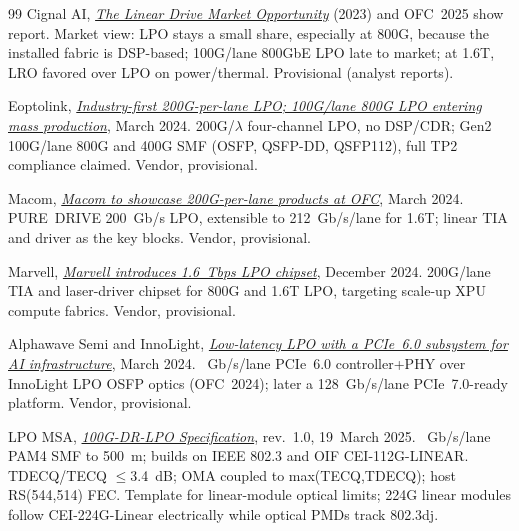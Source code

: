 \begin{thebibliography}{99}
Cignal AI, \emph{\href{https://cignal.ai/2023/08/linear-drive-market-opportunity/}{The
Linear Drive Market Opportunity}} (2023) and OFC~2025 show report.
\newblock Market view: LPO stays a small share, especially at 800G, because the
installed fabric is DSP-based; 100G/lane 800GbE LPO late to market; at 1.6T,
LRO favored over LPO on power/thermal. Provisional (analyst reports).

Eoptolink, \emph{\href{https://www.eoptolink.com/news/13-new-products/348-eoptolink-demonstrates-industry-1st-200g-lane-lpos-with-100g-lane-800g-lpos-entering-mass-production}{Industry-first
200G-per-lane LPO; 100G/lane 800G LPO entering mass production}}, March 2024.
\newblock 200G/$\lambda$ four-channel LPO, no DSP/CDR; Gen2 100G/lane 800G and
400G SMF (OSFP, QSFP-DD, QSFP112), full TP2 compliance claimed. Vendor,
provisional.

Macom, \emph{\href{https://ir.macom.com/news-releases/news-release-details/macom-showcase-200g-lane-products-optical-fiber-communication}{Macom
to showcase 200G-per-lane products at OFC}}, March 2024.
\newblock PURE~DRIVE 200~Gb/s LPO, extensible to 212~Gb/s/lane for 1.6T; linear
TIA and driver as the key blocks. Vendor, provisional.

Marvell, \emph{\href{https://www.marvell.com/company/newsroom/marvell-introduces-1-6-tbps-lpo-chipset.html}{Marvell
introduces 1.6~Tbps LPO chipset}}, December 2024.
\newblock 200G/lane TIA and laser-driver chipset for 800G and 1.6T LPO, targeting
scale-up XPU compute fabrics. Vendor, provisional.

Alphawave Semi and InnoLight, \emph{\href{https://awavesemi.com/press-release/alphawave-semi-and-innolight-collaborate-to-demonstrate-low-latency-linear-pluggable-optics-with-pcie-6-0-subsystem-solution-for-high-performance-ai-infrastructure-at-ofc-2024/}{Low-latency
LPO with a PCIe~6.0 subsystem for AI infrastructure}}, March 2024.
~Gb/s/lane PCIe~6.0 controller+PHY over InnoLight LPO OSFP optics
(OFC~2024); later a 128~Gb/s/lane PCIe~7.0-ready platform. Vendor, provisional.

LPO MSA, \emph{\href{https://www.lpo-msa.org/files/live/sites/lpomsa/files/specs/LPO_MSA_Specification_v1p01.pdf}{100G-DR-LPO Specification}},
rev.~1.0, 19~March 2025.
~Gb/s/lane PAM4 SMF to 500~m; builds on IEEE 802.3 and OIF
CEI-112G-LINEAR. TDECQ/TECQ $\le$3.4~dB; OMA coupled to max(TECQ,TDECQ); host
RS(544,514) FEC. Template for linear-module optical limits; 224G linear modules
follow CEI-224G-Linear electrically while optical PMDs track 802.3dj.


\end{thebibliography}
